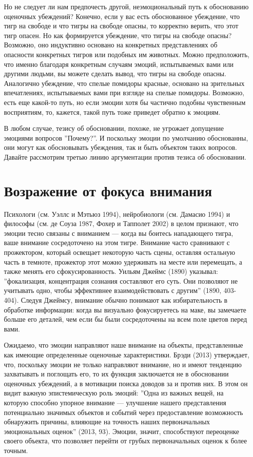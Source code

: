 \documentclass[11pt]{book}
\begin{document}
Но не следует ли нам предпочесть другой, неэмоциональный путь к обоснованию оценочных убеждений? Конечно, если у вас есть обоснованное убеждение, что тигр на свободе и что тигры на свободе опасны, то корректно верить, что этот тигр опасен. Но как формируется убеждение, что тигры на свободе опасны? Возможно, оно индуктивно основано на конкретных представлениях об опасности конкретных тигров или подобных им животных. Можно предположить, что именно благодаря конкретным случаям эмоций, испытываемых вами или другими людьми, вы можете сделать вывод, что тигры на свободе опасны. Аналогично убеждение, что спелые помидоры красные, основано на зрительных впечатлениях, испытываемых вами при взгляде на спелые помидоры. Возможно, есть еще какой-то путь, но если эмоции хотя бы частично подобны чувственным восприятиям, то, кажется, такой путь тоже приведет обратно к эмоциям.

В любом случае, тезису об обосновании, похоже, не угрожает допущение эмоциями вопросов ''Почему?''. И поскольку эмоции по умолчанию обоснованны, они могут как обосновывать убеждения, так и быть объектом таких вопросов. Давайте рассмотрим третью линию аргументации против тезиса об обосновании.

\section{Возражение от фокуса внимания}

Психологи (см. Уэллс и Мэтьюз 1994), нейробиологи (см. Дамасио 1994) и философы (см. де Соуза 1987, Фохер и Тапполет 2002) в целом признают, что эмоции тесно связаны с вниманием --- когда вы боитесь нападающего тигра, ваше внимание сосредоточено на этом тигре. Внимание часто сравнивают с прожектором, который освещает некоторую часть сцены, оставляя остальную часть в темноте, прожектор этот можно удерживать на месте или перемещать, а также менять его сфокусированность. Уильям Джеймс (1890) указывал: ''фокализация, концентрация сознания составляют его суть. Они позволяют не учитывать одно, чтобы эффективнее взаимодействовать с другим'' (1890, 403-404). Следуя Джеймсу, внимание обычно понимают как избирательность в обработке информации: когда вы визуально фокусируетесь на маке, вы замечаете больше его деталей, чем если бы были сосредоточены на всем поле цветов перед вами.

Ожидаемо, что эмоции направляют наше внимание на объекты, представленные как имеющие определенные оценочные характеристики. Брэди (2013) утверждает, что, поскольку эмоции не только направляют внимание, но и имеют тенденцию захватывать и поглощать его, то их функция заключается не в обосновании оценочных убеждений, а в мотивации поиска доводов за и против них. В этом он видит важную эпистемическую роль эмоций: ''Одна из важных вещей, на которую способно упорное внимание --- улучшение нашего представления потенциально значимых объектов и событий через предоставление возможность обнаружить причины, влияющие на точность наших первоначальных эмоциональных оценок'' (2013, 93). Эмоции, значит, способствуют переоценке своего объекта, что позволяет перейти от грубых первоначальных оценок к более точным.
\end{document}
